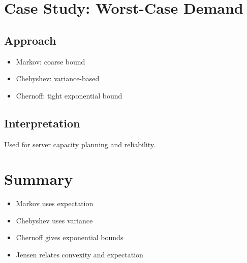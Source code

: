 \documentclass[11pt]{article}
\begin{document}
\section{Case Study: Worst-Case Demand}

\subsection*{Approach}
\begin{itemize}
\item Markov: coarse bound
\item Chebyshev: variance-based
\item Chernoff: tight exponential bound
\end{itemize}

\subsection*{Interpretation}
Used for server capacity planning and reliability.

\section{Summary}

\begin{itemize}
\item Markov uses expectation
\item Chebyshev uses variance
\item Chernoff gives exponential bounds
\item Jensen relates convexity and expectation
\end{itemize}
\end{document}
